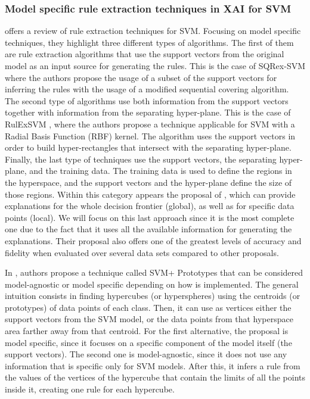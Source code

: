 \subsubsection{Model specific rule extraction techniques in XAI for SVM}\label{subsubsec:ch2-sota-xai-rule-extraction-specific}
\leavevmode\newline
\parencite{barakat2010rule} offers a review of rule extraction techniques for SVM. Focusing on model specific techniques, they highlight three different types of algorithms. The first of them are rule extraction algorithms that use the support vectors from the original model as an input source for generating the rules. This is the case of SQRex-SVM \parencite{barakat2007rule} where the authors propose the usage of a subset of the support vectors for inferring the rules with the usage of a modified sequential covering algorithm. 
The second type of algorithms use both information from the support vectors together with information from the separating hyper-plane. This is the case of RulExSVM \parencite{fu2004extracting}, where the authors propose a technique applicable for SVM with a Radial Basis Function (RBF) kernel. The algorithm uses the support vectors in order to build hyper-rectangles that intersect with the separating hyper-plane. Finally, the last type of techniques use the support vectors, the separating hyper-plane, and the training data. The training data is used to define the regions in the hyperspace, and the support vectors and the hyper-plane define the size of those regions. Within this category appears the proposal of \parencite{nunez2002rule}, which can provide explanations for the whole decision frontier (global), as well as for specific data points (local). We will focus on this last approach since it is the most complete one due to the fact that it uses all the available information for generating the explanations. Their proposal also offers one of the greatest levels of accuracy and fidelity when evaluated over several data sets compared to other proposals.

In \parencite{nunez2002rule}, authors propose a technique called SVM+ Prototypes that can be considered model-agnostic or model specific depending on how is implemented. The general intuition consists in finding hypercubes (or hyperspheres) using the centroids (or prototypes) of data points of each class. Then, it can use as vertices either the support vectors from the SVM model, or the data points from that hyperspace area farther away from that centroid. For the first alternative, the proposal is model specific, since it focuses on a specific component of the model itself (the support vectors). The second one is model-agnostic, since it does not use any information that is specific only for SVM models.
After this, it infers a rule from the values of the vertices of the hypercube that contain the limits of all the points inside it, creating one rule for each hypercube.

